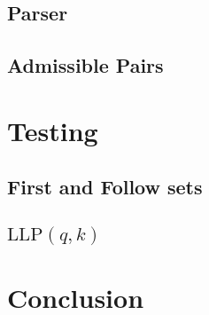 \documentclass[a4paper,12pt]{article}
\newcommand\LLP{\text{LLP}}
\theoremstyle{definition}
\begin{document}
\subsection{Parser}


\subsection{Admissible Pairs}


\section{Testing}
\subsection{First and Follow sets}


\subsection{\texorpdfstring{$\LLP(q,k)$}{TEXT}}




\section{Conclusion}

\printbibliography
\end{document}
